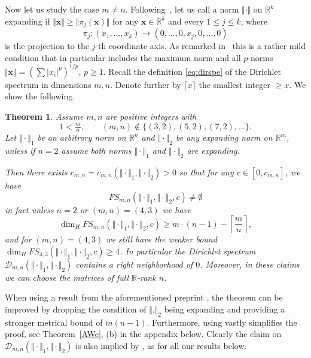 \documentclass[10pt]{amsart}
\newtheorem{theorem}{Theorem}[section]
\theoremstyle{definition}
\newcommand{\R}{\mathbb{R}}
\begin{document}
Now let us study the case $m\ne n$.
Following~\cite{j1}, let us call a norm $\Vert\cdot\Vert$ on $\mathbb{R}^{k}$ expanding
if $\Vert \textbf{x}\Vert\ge \Vert \pi_j(\textbf{x})\Vert$ for any $\textbf{x}\in \mathbb{R}^k$ and every $1\le j\le k$, where $$\pi_j: (x_1,\ldots,x_k)\to (0,\ldots,0,x_j,0,\ldots,0)$$ is the projection to the $j$-th coordinate axis. As remarked
in~\cite{j1} this is a rather mild condition that in particular includes the maximum norm and all $p$-norms $\Vert \textbf{x}\Vert=(\sum |x_i|^p)^{1/p}$, $p\ge 1$. Recall the definition \eqref{eq:dirspe} of
the Dirichlet spectrum in dimensions $m,n$. Denote further by $\lceil x\rceil$ the smallest integer $\ge x$.
We show the following.

\begin{theorem}  \label{ganze}
    Assume $m,n$ are positive integers with
    \[
  1 < \tfrac{m}{n}, \qquad (m,n)\notin \{(3,2), (5,2), (7,2), \ldots \}. 
    \]
    Let $\Vert\cdot\Vert_1$  be an arbitrary norm on $\R^n$
    and $\Vert\cdot\Vert_2$ be any expanding norm on $\R^m$, unless if
    $n=2$ assume both norms $\Vert\cdot\Vert_1$ 
    and $\Vert\cdot\Vert_2$ are expanding.
    
    Then there exists $c_{m,n}=c_{m,n}(\Vert\cdot \Vert_1,\Vert\cdot\Vert_2)>0$ so that
    for any $c\in [0,c_{m,n}]$, we have
    \[
    FS_{m,n}(\Vert \cdot \Vert_{1},\Vert \cdot \Vert_{2},c)\ne \emptyset
    \]
    in fact unless $n=2$ or $(m,n)=(4,3)$
    we have
    \[
    \dim_H FS_{m,n}(\Vert \cdot \Vert_{1},\Vert \cdot \Vert_{2},c)\ge m\cdot (n-1)-\left\lceil\frac{m}{n}\right\rceil, 
    \]
    and for $(m,n)=(4,3)$ we still have the weaker bound
    $ \dim_H FS_{4,3}(\Vert \cdot \Vert_{1},\Vert \cdot \Vert_{2},c)\ge 4$. In particular the Dirichlet spectrum $\mathcal{D}_{m,n}(\Vert\cdot\Vert_1, \Vert\cdot\Vert_2)$ contains a right neighborhood of $0$. 
    Moreover, in these claims we can choose the matrices
    of full $\R$-rank $n$.
\end{theorem}

 When using a result from the aforementioned preprint \cite{AginWeiss2024}, the theorem can be improved by dropping the condition of $\Vert.\Vert_2$ being expanding and providing a stronger metrical bound of $m(n-1)$. Furthermore, using \cite{AginWeiss2024} vastly simplifies the proof, see 
Theorem~\ref{AWe}, (b) in the appendix below. Clearly the claim on $\mathcal{D}_{m,n}(\Vert\cdot\Vert_1, \Vert\cdot\Vert_2)$ is also implied by \cite{AginWeiss2024}, as for all our results below.
\end{document}
